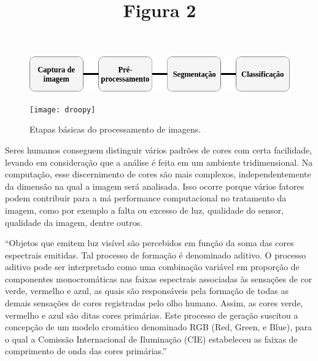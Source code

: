 \title{Figura 2} 
\date{} %
\maketitle
\begin{figure}[h]
\caption{{\footnotesize Etapas básicas do processamento de imagens.}}
 
\centering %
\includegraphics[width=12cm]{revisao-bibliografica/Figuras/etapas-processamento.jpg} %
\label{figura:figura2}

\centering {}
{
\texttt{[image: droopy]}
\label{figura:figura2}
}
\end{figure}

Seres humanos conseguem distinguir vários padrões de cores com certa facilidade, levando em consideração que a análise é feita em um ambiente tridimensional. Na computação, esse discernimento de cores são mais complexos, independentemente da dimensão na qual a imagem será analisada. Isso ocorre porque vários fatores podem contribuir para a má performance computacional no tratamento da imagem, como por exemplo a falta ou excesso de luz, qualidade do sensor, qualidade da imagem, dentre outros.

\begin{quoting}[rightmargin=0cm,leftmargin=4cm]
\begin{singlespace}
{\footnotesize  
“Objetos que emitem luz visível são percebidos em função da soma das cores espectrais emitidas. Tal processo de formação é denominado aditivo. O processo aditivo pode ser interpretado como uma combinação variável em proporção de componentes monocromáticas nas faixas espectrais associadas às sensações de cor verde, vermelho e azul, as quais são responsáveis pela formação de todas as demais sensações de cores registradas pelo olho humano. Assim, as cores verde, vermelho e azul são ditas cores primárias. Este processo de geração suscitou a concepção de um modelo cromático denominado RGB (Red, Green, e Blue), para o qual a Comissão Internacional de Iluminação (CIE) estabeleceu as faixas de comprimento de onda das cores primárias.” \cite{QUEIROZ2006}
}
\end{singlespace}
\end{quoting}

